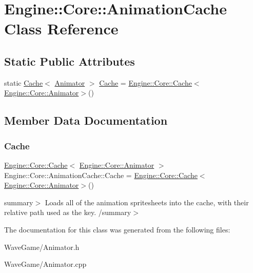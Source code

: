 \hypertarget{class_engine_1_1_core_1_1_animation_cache}{}\section{Engine\+:\+:Core\+:\+:Animation\+Cache Class Reference}
\label{class_engine_1_1_core_1_1_animation_cache}
\subsection*{Static Public Attributes}
\begin{DoxyCompactItemize}
\item 
static \hyperlink{class_engine_1_1_core_1_1_cache}{Cache}$<$ \hyperlink{class_engine_1_1_core_1_1_animator}{Animator} $>$ \hyperlink{class_engine_1_1_core_1_1_animation_cache_a2d677b71c3a959135f28bd15709d8c01}{Cache} = \hyperlink{class_engine_1_1_core_1_1_cache}{Engine\+::\+Core\+::\+Cache}$<$\hyperlink{class_engine_1_1_core_1_1_animator}{Engine\+::\+Core\+::\+Animator}$>$()
\end{DoxyCompactItemize}


\subsection{Member Data Documentation}
\mbox{\label{class_engine_1_1_core_1_1_animation_cache_a2d677b71c3a959135f28bd15709d8c01}} 
\subsubsection{\texorpdfstring{Cache}{Cache}}
{\footnotesize\ttfamily \hyperlink{class_engine_1_1_core_1_1_cache}{Engine\+::\+Core\+::\+Cache}$<$ \hyperlink{class_engine_1_1_core_1_1_animator}{Engine\+::\+Core\+::\+Animator} $>$ Engine\+::\+Core\+::\+Animation\+Cache\+::\+Cache = \hyperlink{class_engine_1_1_core_1_1_cache}{Engine\+::\+Core\+::\+Cache}$<$\hyperlink{class_engine_1_1_core_1_1_animator}{Engine\+::\+Core\+::\+Animator}$>$()\hspace{0.3cm}{\ttfamily [static]}}

summary$>$ Loads all of the animation spritesheets into the cache, with their relative path used as the key. /summary$>$ 

The documentation for this class was generated from the following files\+:\begin{DoxyCompactItemize}
\item 
Wave\+Game/Animator.\+h\item 
Wave\+Game/Animator.\+cpp\end{DoxyCompactItemize}

